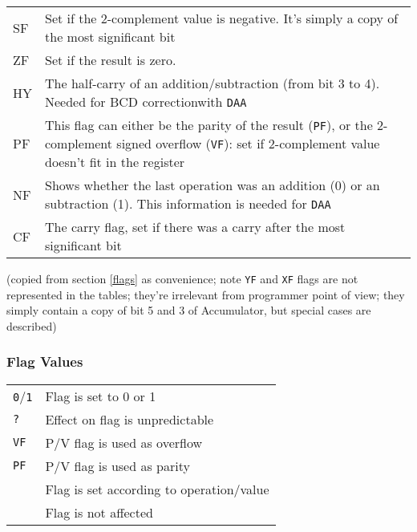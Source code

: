 \documentclass[twoside,openright,a4paper]{book}
\newcommand{\notet}{\rule{0pt}{2.4ex}}
\begin{document}
\begin{tabular}{lp{13cm}}
	SF & 
		Set if the 2-complement value is negative.  It’s simply a copy of the most significant bit \\
	ZF\notet & 
		Set if the result is zero. \\
	HY\notet & 
		The half-carry of an addition/subtraction (from bit 3 to 4). Needed for BCD correctionwith {\tt DAA} \\
	PF\notet & 
		This flag can either be the parity of the result ({\tt PF}), or the 2-complement signed overflow ({\tt VF}): set if 2-complement value doesn’t fit in the register \\
	NF\notet & 
		Shows whether the last operation was an addition (0) or an subtraction  (1). This information is needed for {\tt DAA} \\
	CF\notet & 
		The carry flag, set if there was a carry after the most significant bit \\
\end{tabular}

(copied from section \ref{flags} as convenience; note {\tt YF} and {\tt XF} flags are not represented in the tables; they're irrelevant from programmer point of view; they simply contain a copy of bit 5 and 3 of Accumulator, but special cases are described)

\subsubsection{Flag Values}

\begin{tabular}{ll}
	{\tt 0}/{\tt 1} & Flag is set to 0 or 1 \\
	{\tt ?} & Effect on flag is unpredictable \\
	{\tt VF} & P/V flag is used as overflow \\
	{\tt PF} & P/V flag is used as parity \\
	{\tt \FS} & Flag is set according to operation/value \\
	{\tt \FN} & Flag is not affected \\
\end{tabular}


\pagebreak

%
%
\end{document}

